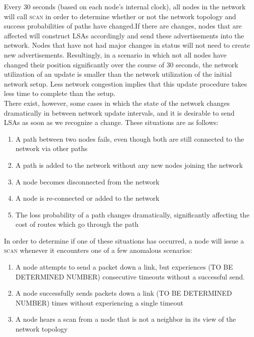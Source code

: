 \documentclass[letterpaper]{article}
\begin{document}
\noindent Every 30 seconds (based on each node's internal clock), all nodes in the network will call 
\textsc{scan} in order to determine whether or not the network topology and success probabilities of
paths have changed.If there are changes, nodes that are affected will construct LSAs accordingly and send
these advertisements into the network. Nodes that have not had major changes in status will not need to
create new advertisements. Resultingly, in a scenario in which not all nodes have changed their position
significantly over the course of 30 seconds, the network utilization of an update is smaller than the
network utilization of the initial network setup. Less network congestion implies that this update
procedure takes less time to complete than the setup.
\\

\noindent There exist, however, some cases in which the state of the network changes dramatically in 
between network update intervals, and it is desirable to send LSAs as soon as we recognize a change.
These situations are as follows:

\begin{enumerate}
  \item A path between two nodes fails, even though both are still connected to the network via other
  paths
  \item A path is added to the network without any new nodes joining the network
  \item A node becomes disconnected from the network
  \item A node is re-connected or added to the network
  \item The loss probability of a path changes dramatically, significantly affecting the cost of
  routes which go through the path
\end{enumerate}

\noindent In order to determine if one of these situations has occurred, a node will issue a 
\textsc{scan} whenever it encounters one of a few anomalous scenarios:

\begin{enumerate}
  \item A node attempts to send a packet down a link, but experiences (TO BE DETERMINED NUMBER) 
  consecutive timeouts without a successful send.
  \item A node successfully sends packets down a link (TO BE DETERMINED NUMBER) times without
  experiencing a single timeout
  \item A node hears a scan from a node that is not a neighbor in its view of the network topology
\end{enumerate}
\end{document}
